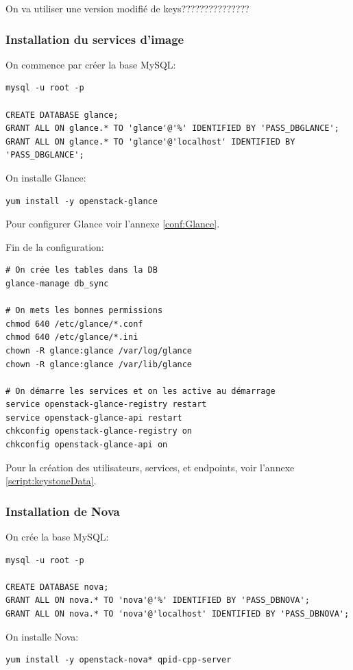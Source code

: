 \documentclass[a4paper,oneside]{report}
\begin{document}
On va utiliser une version modifié de keys???????????????


\subsubsection{Installation du services d'image}
\noindent On commence par créer la base MySQL:
\begin{verbatim}
mysql -u root -p

CREATE DATABASE glance;
GRANT ALL ON glance.* TO 'glance'@'%' IDENTIFIED BY 'PASS_DBGLANCE';
GRANT ALL ON glance.* TO 'glance'@'localhost' IDENTIFIED BY 'PASS_DBGLANCE';
\end{verbatim}

\noindent On installe Glance:
\begin{verbatim}
yum install -y openstack-glance
\end{verbatim}

\noindent Pour configurer Glance voir l'annexe \ref{conf:Glance}.

\noindent Fin de la configuration:
\begin{verbatim}
# On crée les tables dans la DB
glance-manage db_sync

# On mets les bonnes permissions
chmod 640 /etc/glance/*.conf
chmod 640 /etc/glance/*.ini
chown -R glance:glance /var/log/glance
chown -R glance:glance /var/lib/glance

# On démarre les services et on les active au démarrage
service openstack-glance-registry restart
service openstack-glance-api restart
chkconfig openstack-glance-registry on
chkconfig openstack-glance-api on
\end{verbatim}

\noindent Pour la création des utilisateurs, services, et endpoints, voir l'annexe \ref{script:keystoneData}.

\subsubsection{Installation de Nova}
\noindent On crée la base MySQL:
\begin{verbatim}
mysql -u root -p

CREATE DATABASE nova;
GRANT ALL ON nova.* TO 'nova'@'%' IDENTIFIED BY 'PASS_DBNOVA';
GRANT ALL ON nova.* TO 'nova'@'localhost' IDENTIFIED BY 'PASS_DBNOVA';
\end{verbatim}

\noindent On installe Nova:
\begin{verbatim}
yum install -y openstack-nova* qpid-cpp-server
\end{verbatim}
\end{document}
